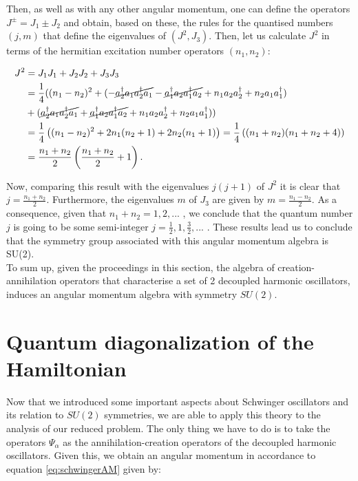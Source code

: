 Then, as well as with any other angular momentum, one can define the operators $J^\pm = J_1\pm J_2$ and obtain, based on these, the rules for the quantised numbers $(j,m)$ that define the eigenvalues of $(J^2,J_3)$. Then, let us calculate $J^2$ in terms of the hermitian excitation number operators $(n_1,n_2)$:

\begin{align*}
J^2 &= J_1J_1+J_2J_2+J_3J_3\\
&= \frac{1}{4}( (n_1-n_2)^2 +(-\cancel{a_2^\dagger a_1a_2^\dagger a_1}- \cancel{a_1^\dagger a_2a_1^\dagger a_2}+n_1a_2a_2^\dagger+n_2a_1a_1^\dagger)\\
&+(\cancel{a_2^\dagger a_1a_2^\dagger a_1}+ \cancel{a_1^\dagger a_2a_1^\dagger a_2}+n_1a_2a_2^\dagger+n_2a_1a_1^\dagger))\\
&= \frac{1}{4}\left( (n_1-n_2)^2 + 2n_1(n_2+1)+2n_2(n_1+1) \right) = \frac{1}{4}\left( (n_1+n_2)(n_1+n_2+4) \right)\\
&= \frac{n_1+n_2}{2}\left( \frac{n_1+n_2}{2}+1 \right).
\end{align*}

Now, comparing this result with the eigenvalues $j(j+1)$ of $J^2$ it is clear that $j = \frac{n_1+n_2}{2}$. Furthermore, the eigenvalues $m$ of $J_3$ are given by  $m = \frac{n_1-n_2}{2}$. As a consequence, given that $n_1+n_2 = 1,2,...$ , we conclude that the quantum number $j$ is going to be some semi-integer $j= \frac{1}{2},1,\frac{3}{2},...$ . These results lead us to conclude that the symmetry group associated with this angular momentum algebra is SU(2).\\

To sum up, given the proceedings in this section, the algebra of creation-annihilation operators that characterise a set of 2 decoupled harmonic oscillators, induces an angular momentum algebra with symmetry $SU(2)$.

\section{Quantum diagonalization of the Hamiltonian}
Now that we introduced some important aspects about Schwinger oscillators and its relation to $SU(2)$ symmetries, we are able to apply this theory to the analysis of our reduced problem. The only thing we have to do is to take the operators $\Psi_\alpha$ as the annihilation-creation operators of the decoupled harmonic oscillators. Given this, we obtain an angular momentum in accordance to equation \eqref{eq:schwingerAM} given by:

